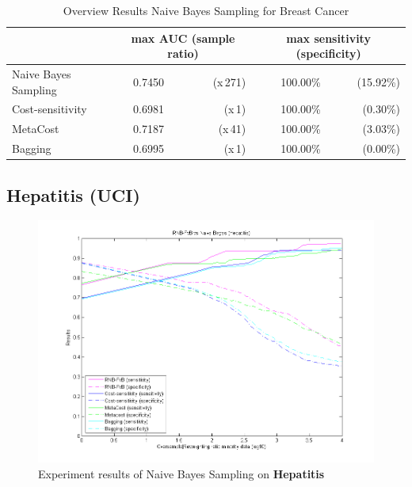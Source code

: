 \begin{table}[h]
\centering  
\begin{tabular}{ l | c r | r r|}                                      
& \multicolumn{2}{c}{max AUC (sample ratio)} & \multicolumn{2}{c}{max sensitivity (specificity)} \\
\hline 
Naive Bayes Sampling & 0.7450 & (x\,271) & 100.00\% & (15.92\%)\\
Cost-sensitivity & 0.6981 & (x\,1) & 100.00\% & (0.30\%)\\
MetaCost & 0.7187 & (x\,41) & 100.00\% & (3.03\%)\\
Bagging & 0.6995 & (x\,1) & 100.00\% & (0.00\%)\\
\hline                          %
\end{tabular}
\label{tab:PPer}
\caption{Overview Results Naive Bayes Sampling for Breast Cancer} %
\end{table}


\newpage
\subsection{Hepatitis (UCI)}
\begin{figure}[h]
\includegraphics[scale=0.65]{img/RNB-FvB-hepatitis.png}
\caption{Experiment results of Naive Bayes Sampling on \textbf{Hepatitis}}
\end{figure}

